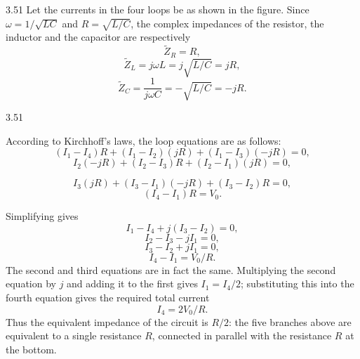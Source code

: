 \begin{solution}{3.51}
Let the currents in the four loops be as shown in the figure. Since $\omega=1/\sqrt{LC}$ and $R=\sqrt{L/C}$, the complex impedances of the resistor, the inductor and the capacitor are respectively
\[
\tilde{Z}_R=R,
\]
\[
\tilde{Z}_L=j\omega L=j\sqrt{L/C}=jR,
\]
\[
\tilde{Z}_C=\frac{1}{j\omega C}=-\sqrt{L/C}=-jR.
\]
\begin{figbox}{3.51}
\end{figbox}

According to Kirchhoff's laws, the loop equations are as follows:
\[
(I_1-I_4)R+(I_1-I_2)(jR)+(I_1-I_3)(-jR)=0,
\]
\[
I_2(-jR)+(I_2-I_3)R+(I_2-I_1)(jR)=0,
\]

\[
I_3(jR)+(I_3-I_1)(-jR)+(I_3-I_2)R=0,
\]
\[
(I_4-I_1)R=V_0.
\]

Simplifying gives
\[
I_1-I_4+j(I_3-I_2)=0,
\]
\[
I_2-I_3-jI_1=0,
\]
\[
I_3-I_2+jI_1=0,
\]
\[
I_4-I_1=V_0/R.
\]
The second and third equations are in fact the same. Multiplying the second equation by $j$ and adding it to the first gives $I_1=I_4/2$; substituting this into the fourth equation gives the required total current
\[
I_4=2V_0/R.
\]
Thus the equivalent impedance of the circuit is $R/2$: the five branches above are equivalent to a single resistance $R$, connected in parallel with the resistance $R$ at the bottom.
\end{solution}

